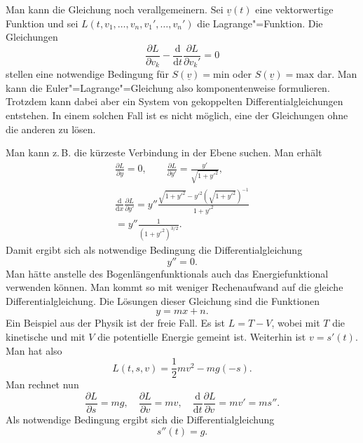 \documentclass[a4paper,10pt,fleqn,twocolumn,twoside]{article}
\numberwithin{equation}{section}
\begin{document}
Man kann die Gleichung noch verallgemeinern. Sei $\underline v(t)$
eine vektorwertige Funktion und sei
$L(t,v_1,\ldots,v_n,v_1',\ldots,v_n')$ die Lagrange"=Funktion.
Die Gleichungen
\begin{equation}
\frac{\partial L}{\partial v_k}
-\frac{\mathrm d}{\mathrm dt}\frac{\partial L}{\partial v_k'}
=0
\end{equation}
stellen eine notwendige Bedingung für
$S(\underline v)=\mathrm{min}$ oder
$S(\underline v)=\mathrm{max}$ dar.
Man kann die Euler"=Lagrange"=Gleichung also komponentenweise
formulieren. Trotzdem kann dabei aber ein System von gekoppelten
Differentialgleichungen entstehen. In einem solchen Fall ist es
nicht möglich, eine der Gleichungen ohne die anderen zu lösen.

Man kann z.\,B. die kürzeste Verbindung in der Ebene suchen. Man erhält
\begin{gather*}
\frac{\partial L}{\partial y} = 0,\qquad
\frac{\partial L}{\partial y'} = \frac{y'}{\sqrt{1+y'^2}},\\
\frac{\mathrm d}{\mathrm dx}\frac{\partial L}{\partial y'}
= y''\frac{\sqrt{1+y'^2}-y'^2(\sqrt{1+y'^2})^{-1}}{1+y'^2}\\
= y''\frac{1}{(1+y'^2)^{3/2}}.
\end{gather*}
Damit ergibt sich als notwendige Bedingung die Differentialgleichung
\begin{equation}
y''=0.
\end{equation}
Man hätte anstelle des Bogenlängenfunktionals auch das
Energiefunktional verwenden können. Man kommt so mit weniger
Rechenaufwand auf die gleiche Differentialgleichung.
Die Lösungen dieser Gleichung sind die Funktionen
\begin{equation}
y=mx+n.
\end{equation}
Ein Beispiel aus der Physik ist der freie Fall. Es ist $L=T-V$,
wobei mit $T$ die kinetische und mit $V$ die potentielle Energie
gemeint ist. Weiterhin ist $v=s'(t)$. Man hat also
\begin{equation}
L(t,s,v) = \frac{1}{2}mv^2 - mg(-s).
\end{equation}
Man rechnet nun
\begin{equation}
\frac{\partial L}{\partial s} = mg,\quad
\frac{\partial L}{\partial v} = mv,\quad
\frac{\mathrm d}{\mathrm dt}\frac{\partial L}{\partial v}
= mv' = ms''.
\end{equation}
Als notwendige Bedingung ergibt sich die Differentialgleichung
\begin{equation}
s''(t) = g.
\end{equation}
\end{document}
